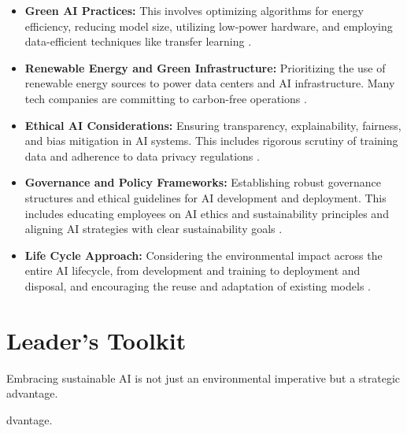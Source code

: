 \begin{itemize}
    \item \textbf{Green AI Practices:} This involves optimizing algorithms for energy efficiency, reducing model size, utilizing low-power hardware, and employing data-efficient techniques like transfer learning \parencite{AccessPartnership2023}.
    \item \textbf{Renewable Energy and Green Infrastructure:} Prioritizing the use of renewable energy sources to power data centers and AI infrastructure. Many tech companies are committing to carbon-free operations \parencite{Exaud2023}.
    \item \textbf{Ethical AI Considerations:} Ensuring transparency, explainability, fairness, and bias mitigation in AI systems. This includes rigorous scrutiny of training data and adherence to data privacy regulations \parencite{AlgorithmWatch2023}.
    \item \textbf{Governance and Policy Frameworks:} Establishing robust governance structures and ethical guidelines for AI development and deployment. This includes educating employees on AI ethics and sustainability principles and aligning AI strategies with clear sustainability goals \parencite{PMI2025}.
    \item \textbf{Life Cycle Approach:} Considering the environmental impact across the entire AI lifecycle, from development and training to deployment and disposal, and encouraging the reuse and adaptation of existing models \parencite{ProfileTree2023}.
\end{itemize}

\section{Leader's Toolkit}
\label{sec:sustainability_leaders_toolkit}

Embracing sustainable AI is not just an environmental imperative but a strategic advantage.

dvantage.

